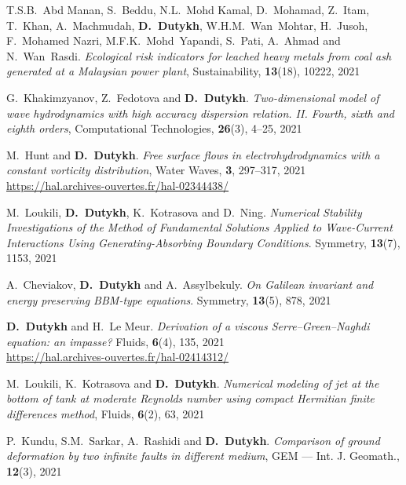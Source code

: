 \begin{etaremune}
  \item T.S.B.~Abd Manan, S.~Beddu, N.L.~Mohd Kamal, D.~Mohamad, Z.~Itam, T.~Khan, A.~Machmudah, \textbf{D.~Dutykh}, W.H.M.~Wan~Mohtar, H.~Jusoh, F.~Mohamed Nazri, M.F.K.~Mohd~Yapandi, S.~Pati, A.~Ahmad and N.~Wan~Rasdi. \textit{Ecological risk indicators for leached heavy metals from coal ash generated at a Malaysian power plant}, Sustainability, \textbf{13}(18), 10222, 2021 %
  
  \item G.~Khakimzyanov, Z.~Fedotova and \textbf{D.~Dutykh}. \textit{Two-dimensional model of wave hydrodynamics with high accuracy dispersion relation. II. Fourth, sixth and eighth orders}, Computational Technologies, \textbf{26}(3), 4--25, 2021 %
  
  \item M.~Hunt and \textbf{D.~Dutykh}. \textit{Free surface flows in electrohydrodynamics with a constant vorticity distribution}, Water Waves, \textbf{3}, 297--317, 2021 \\ %
  \url{https://hal.archives-ouvertes.fr/hal-02344438/}
  
  \item M.~Loukili, \textbf{D.~Dutykh}, K.~Kotrasova and D.~Ning. \textit{Numerical Stability Investigations of the Method of Fundamental Solutions Applied to Wave-Current Interactions Using Generating-Absorbing Boundary Conditions}. Symmetry, \textbf{13}(7), 1153, 2021 %
  
  \item A.~Cheviakov, \textbf{D.~Dutykh} and A.~Assylbekuly. \textit{On Galilean invariant and energy preserving BBM-type equations}. Symmetry, \textbf{13}(5), 878, 2021 %
  
  \item \textbf{D.~Dutykh} and H.~Le Meur. \textit{Derivation of a viscous Serre--Green--Naghdi equation: an impasse?} Fluids, \textbf{6}(4), 135, 2021 \\ %
  \url{https://hal.archives-ouvertes.fr/hal-02414312/}
  
  \item M.~Loukili, K.~Kotrasova and \textbf{D.~Dutykh}. \textit{Numerical modeling of jet at the bottom of tank at moderate Reynolds number using compact Hermitian finite differences method}, Fluids, \textbf{6}(2), 63, 2021 %
  
  \item P.~Kundu, S.M.~Sarkar, A.~Rashidi and \textbf{D.~Dutykh}. \textit{Comparison of ground deformation by two infinite faults in different medium}, GEM --- Int. J. Geomath., \textbf{12}(3), 2021 %
  

\end{etaremune}
